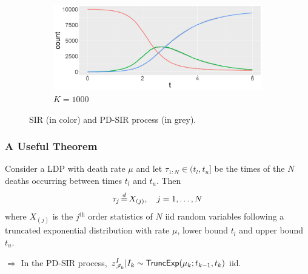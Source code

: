 \documentclass{beamer}
\begin{document}
\begin{frame}
\begin{figure}
\begin{subfigure}[b]{0.49\textwidth}
			\centering
			\includegraphics[width=\textwidth]{E2_K1000.jpeg}
			\caption{$K=1000$}
		\end{subfigure}
		\caption{SIR (in color) and PD-SIR process (in grey).}
	\end{figure}
	
\end{frame}


\begin{frame} \frametitle{A Useful Theorem}
	
	\begin{theorem}		
		Consider a LDP with death rate $\mu$ and let $\tau_{1:N} \in (t_l, t_u]$ be the times of the $N$ deaths occurring between times $t_l$ and $t_u$. Then 
		$$\tau_j \,{\buildrel d \over =}\, X_{(j)}, \quad j = 1, \dots, N$$
		where $X_{(j)}$ is the $j^{\text{th}}$ order statistics of $N$ iid random variables following a truncated exponential distribution with rate $\mu$, lower bound $t_l$ and upper bound $t_u$.		
	\end{theorem}
	\vspace{0.5cm}
	$\Rightarrow$ In the PD-SIR process, $z^I_{\mathscr{I}_k}|I_k \sim \textsf{TruncExp}(\mu_k; t_{k-1}, t_k)$ iid.

\end{frame}
\end{document}
